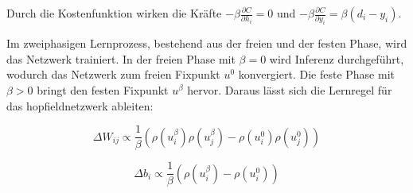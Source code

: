 Durch die Kostenfunktion wirken die Kräfte \(-\beta\frac{\partial C}{\partial h_i}=0\) und \(-\beta\frac{\partial C}{\partial y_i}=\beta(d_i-y_i)\).

Im zweiphasigen Lernprozess, bestehend aus der freien und der festen Phase, wird das Netzwerk trainiert. In der freien Phase mit \(\beta=0\) wird Inferenz durchgeführt, wodurch das Netzwerk zum freien Fixpunkt \(u^0\) konvergiert. Die feste Phase mit \(\beta>0\) bringt den festen Fixpunkt \(u^\beta\) hervor. Daraus lässt sich die Lernregel für das \gls{hopfieldnetzwerk} ableiten:

\[\Delta W_{ij}\propto\frac{1}{\beta}\left(\rho(u_i^\beta)\rho(u_j^\beta)-\rho(u_i^0)\rho(u_j^0)\right)\]

\[\Delta b_i\propto\frac{1}{\beta}\left(\rho(u_i^\beta)-\rho(u_i^0)\right)\]
